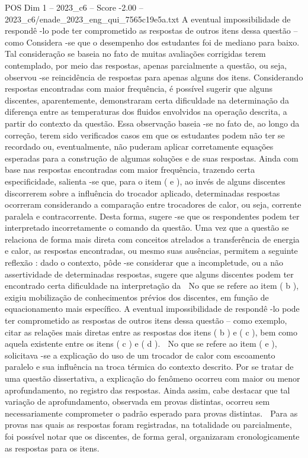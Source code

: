 \begin{textsample}{POS Dim 1 – 2023\_c6 – Score -2.00 – 2023\_c6/enade\_2023\_eng\_qui\_7565c19e5a.txt}
A eventual impossibilidade de respondê -lo pode ter comprometido as respostas de outros itens dessa questão – como Considera -se que o desempenho dos estudantes foi de mediano para baixo.
Tal consideração se baseia no fato de muitas avaliações corrigidas terem contemplado, por meio das respostas, apenas parcialmente a questão, ou seja, observou -se reincidência de respostas para apenas alguns dos itens.
Considerando respostas encontradas com maior frequência, é possível sugerir que alguns discentes, aparentemente, demonstraram certa dificuldade na determinação da diferença entre as temperaturas dos fluidos envolvidos na operação descrita, a partir do contexto da questão.
Essa observação baseia -se no fato de, ao longo da correção, terem sido verificados casos em que os estudantes podem não ter se recordado ou, eventualmente, não puderam aplicar corretamente equações esperadas para a construção de algumas soluções e de suas respostas.
Ainda com base nas respostas encontradas com maior frequência, trazendo certa especificidade, salienta -se que, para o item ( e ), ao invés de alguns discentes discorrerem sobre a influência do trocador aplicado, determinadas respostas ocorreram considerando a comparação entre trocadores de calor, ou seja, corrente paralela e contracorrente.
Desta forma, sugere -se que os respondentes podem ter interpretado incorretamente o comando da questão.
Uma vez que a questão se relaciona de forma mais direta com conceitos atrelados a transferência de energia e calor, as respostas encontradas, ou mesmo suas ausências, permitem a seguinte reflexão : dado o contexto, pôde -se considerar que a incompletude, ou a não assertividade de determinadas respostas, sugere que alguns discentes podem ter encontrado certa dificuldade na interpretação da  No que se refere ao item ( b ), exigiu mobilização de conhecimentos prévios dos discentes, em função de equacionamento mais específico.
A eventual impossibilidade de respondê -lo pode ter comprometido as respostas de outros itens dessa questão – como exemplo, citar as relações mais diretas entre as respostas dos itens ( b ) e ( c ), bem como aquela existente entre os itens ( c ) e ( d ).  No que se refere ao item ( e ), solicitava -se a explicação do uso de um trocador de calor com escoamento paralelo e sua influência na troca térmica do contexto descrito.
Por se tratar de uma questão dissertativa, a explicação do fenômeno ocorreu com maior ou menor aprofundamento, no registro das respostas.
Ainda assim, cabe destacar que tal variação de aprofundamento, observada em provas distintas, ocorreu sem necessariamente comprometer o padrão esperado para provas distintas.  Para as provas nas quais as respostas foram registradas, na totalidade ou parcialmente, foi possível notar que os discentes, de forma geral, organizaram cronologicamente as respostas para os itens.

\end{textsample}
